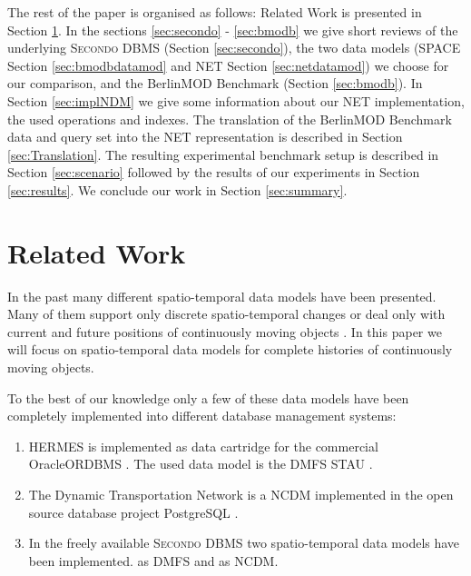 \documentclass[a4paper]{article}
\newcommand{\secondo}{\textsc{Secondo}}
\newcommand{\bmodb} {BerlinMOD Benchmark}
\begin{document}
The rest of the paper is organised as follows: Related Work is presented in Section
\ref{sec:relWork}. In the sections \ref{sec:secondo} - \ref{sec:bmodb} we give
short reviews of the underlying \secondo{} DBMS (Section \ref{sec:secondo}), the two data
models (SPACE Section \ref{sec:bmodbdatamod} and NET Section \ref{sec:netdatamod})
we choose for our comparison, and the \bmodb{} (Section \ref{sec:bmodb}).
In Section \ref{sec:implNDM} we give some information about our NET implementation,
the used operations and indexes.
The translation of the \bmodb{} data and query set into the NET representation
is described in Section \ref{sec:Translation}. The resulting experimental benchmark
setup is described in Section \ref{sec:scenario} followed by the results of our
experiments in Section \ref{sec:results}. We conclude our work in Section \ref{sec:summary}.
\section{Related Work}
\label{sec:relWork}
In the past many different spatio-temporal data models have been presented. Many
of them support only discrete spatio-temporal changes
\cite{sqlstchen,Ramadrachan,Langran1,Langran2,HunterWilliamson}
or deal only with current and future positions of continuously moving objects
\cite{MOSTWolfson}. In this paper we will focus on spatio-temporal data models
for complete histories of continuously moving objects.

To the best of our knowledge only a few of these data models have been completely
implemented into different database management systems:
\begin{enumerate}
  \item HERMES \cite{HERMESMDCPelekis, HERMESPelekis} is implemented as data
cartridge for the commercial Oracle\textregistered ORDBMS \cite{Oracle}. The
used data model is the DMFS STAU \cite{STAUPelekis}.
  \item The Dynamic Transportation Network \cite{DynamicTransportNetworkDing} is
a NCDM implemented in the open source database project PostgreSQL \cite{PostgreSQL}.
  \item In the freely available \secondo{} DBMS \cite{SecondoPlatformPrototypingGueting}
two spatio-temporal data models have been implemented.
\cite{RepresentingMovingObjectsGueting,DataModelDataStructureGueting}
as DMFS and \cite{NetworkGueting} as NCDM.
\end{enumerate}
\end{document}
